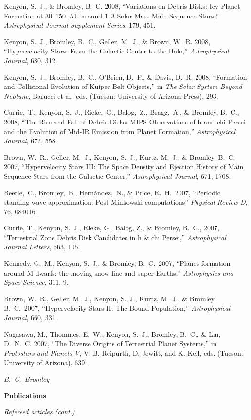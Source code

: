 \documentclass[11pt]{article}
\def\refitem{} %
\def\defsty{\setlength{\parskip}{11pt}
\setlength{\oddsidemargin}{0.0in}
\setlength{\evensidemargin}{0.0in}
\setlength{\parindent}{0in}}
\def\bibsty{\setlength{\parskip}{0pt}
\setlength{\oddsidemargin}{0.33in}
\setlength{\evensidemargin}{0.33in}
\setlength{\parindent}{-0.33in}}
\newcommand{\shead}[1]{\vspace{12.5pt}\centerline{{\bf{#1}}}}
\begin{document}
\refitem Kenyon, S.~J., \& Bromley, B.~C. 2008, ``Variations on Debris
Disks: Icy Planet Formation at 30--150~AU around 1--3 Solar Mass Main
Sequence Stars,'' {\em Astrophysical Journal Supplement Series}, 179,
451.

\refitem Kenyon, S.~J., Bromley, B.~C., Geller, M.~J., \& Brown, W.~R.
2008, ``Hypervelocity Stars: From the Galactic Center to the Halo,''
{\em Astrophysical Journal}, 680, 312.


\refitem Kenyon, S.~J., Bromley, B.~C., O'Brien, D.~P., \& Davis,
D.~R. 2008, ``Formation and Collisional Evolution of Kuiper Belt
Objects,'' in {\em The Solar System Beyond Neptune}, Barucci et
al.\ eds. (Tucson: University of Arizona Press), 293.


\refitem Currie,~T., Kenyon, S.~J., Rieke,~G., Balog,~Z., Bragg,~A.,
\& Bromley, B.~C., 2008, ``The Rise and Fall of Debris Disks: MIPS
Observations of h and chi Persei and the Evolution of Mid-IR Emission
from Planet Formation,'' {\em Astrophysical Journal}, 672, 558.

\refitem Brown, W.~R., Geller, M.~J., Kenyon, S.~J., Kurtz, M.~J., \&
Bromley, B.~C. 2007, ``Hypervelocity Stars III: The Space Density and
Ejection History of Main Sequence Stars from the Galactic Center,''
{\em Astrophysical Journal}, 671, 1708.

\refitem Beetle,~C., Bromley,~B., Hern{\'a}ndez,~N., \& Price,
R.~H.\ 2007, ``Periodic standing-wave approximation: Post-Minkowski
computations'' {\em Physical Review D}, 76, 084016.

\refitem Currie, T., Kenyon, S.~J., Rieke, G., Balog, Z., \& Bromley,
B.~C., 2007, ``Terrestrial Zone Debris Disk Candidates in h \& chi
Persei,'' {\em Astrophysical Journal Letters}, 663, 105.

\refitem Kennedy, G.~M., Kenyon, S.~J., \& Bromley, B.~C.\ 2007,
``Planet formation around M-dwarfs: the moving snow line and
super-Earths,'' {\em Astrophysics and Space Science}, 311, 9.

\refitem Brown, W.~R., Geller, M.~J., Kenyon, S.~J., Kurtz, M.~J., \&
Bromley, B.~C.\ 2007, ``Hypervelocity Stars II: The Bound
Population,'' {\em Astrophysical Journal}, 660, 331.

\refitem Nagasawa, M., Thommes, E.~W., Kenyon, S.~J., Bromley, B.~C., \& Lin,
D.~N.~C. 2007, ``The Diverse Origins of Terrestrial Planet Systems,''
in {\em Protostars and Planets V},
V, B. Reipurth, D. Jewitt, and K. Keil, eds.
(Tucson: University of Arizona), 639.


\newpage
\defsty
\mbox{} \hfill {\it B.\ C.\ Bromley}
\vspace{-11pt}
\shead{Publications}
\centerline{\em Refereed articles (cont.)}
\vspace{-5.5pt}
\bibsty
\end{document}
